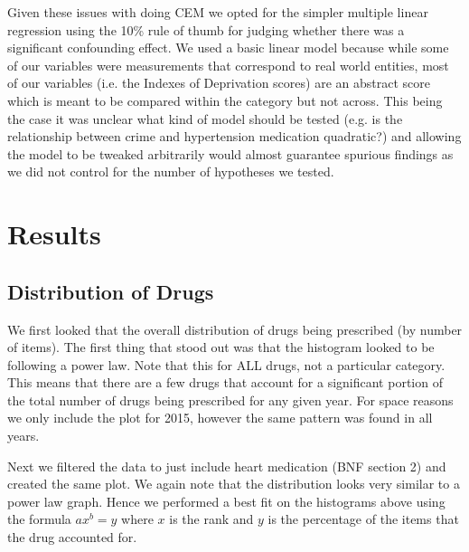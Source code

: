 \documentclass[a4paper]{article}
\begin{document}
		Given these issues with doing CEM we opted for the simpler multiple linear regression using the 
		10\% rule of thumb for judging whether there was a significant confounding effect. We used a 
		basic linear model because while some of our variables were measurements that correspond to 
		real world entities, most of our variables (i.e. the Indexes of Deprivation scores) are
		an abstract score which is meant to be compared within the category but not across. This being the
		case it was unclear what kind of model should be tested (e.g. is the relationship between crime and 
		hypertension medication quadratic?) and allowing the model to be tweaked arbitrarily 
		would almost guarantee spurious findings as we did not control for the number of hypotheses we
		tested.




\section{Results}
	\subsection{Distribution of Drugs}
		We first looked that the overall distribution of drugs being prescribed (by number of items). 
		The first thing that stood out was that the histogram looked to be following a power law. Note 
		that this for ALL drugs, not a particular category. This means that there are a few drugs that 
		account for a significant portion of the total number of drugs being prescribed for any given 
		year. For space reasons we only include the plot for 2015, however the same pattern was found in 
		all years. 


		Next we filtered the data to just include heart medication (BNF section 2) and created the same
		plot. We again note that the distribution looks very similar to a power law graph. Hence we performed 
		a best fit on the histograms above using the formula $ax^{b} = y$ where $x$ is the rank and $y$ is 
		the percentage of the items that the drug accounted for.
\end{document}
